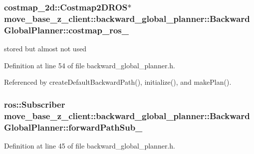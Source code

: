 \subsubsection[{\texorpdfstring{costmap\+\_\+ros\+\_\+}{costmap_ros_}}]{\setlength{\rightskip}{0pt plus 5cm}costmap\+\_\+2d\+::\+Costmap2\+D\+R\+OS$\ast$ move\+\_\+base\+\_\+z\+\_\+client\+::backward\+\_\+global\+\_\+planner\+::\+Backward\+Global\+Planner\+::costmap\+\_\+ros\+\_\+\hspace{0.3cm}{\ttfamily [private]}}\hypertarget{classmove__base__z__client_1_1backward__global__planner_1_1BackwardGlobalPlanner_ae8c01babf5da5df079840246c34ef1ea}{}\label{classmove__base__z__client_1_1backward__global__planner_1_1BackwardGlobalPlanner_ae8c01babf5da5df079840246c34ef1ea}


stored but almost not used 



Definition at line 54 of file backward\+\_\+global\+\_\+planner.\+h.



Referenced by create\+Default\+Backward\+Path(), initialize(), and make\+Plan().

\subsubsection[{\texorpdfstring{forward\+Path\+Sub\+\_\+}{forwardPathSub_}}]{\setlength{\rightskip}{0pt plus 5cm}ros\+::\+Subscriber move\+\_\+base\+\_\+z\+\_\+client\+::backward\+\_\+global\+\_\+planner\+::\+Backward\+Global\+Planner\+::forward\+Path\+Sub\+\_\+\hspace{0.3cm}{\ttfamily [private]}}\hypertarget{classmove__base__z__client_1_1backward__global__planner_1_1BackwardGlobalPlanner_aa30061ee4e43cac7513fb253ccedd077}{}\label{classmove__base__z__client_1_1backward__global__planner_1_1BackwardGlobalPlanner_aa30061ee4e43cac7513fb253ccedd077}


Definition at line 45 of file backward\+\_\+global\+\_\+planner.\+h.



